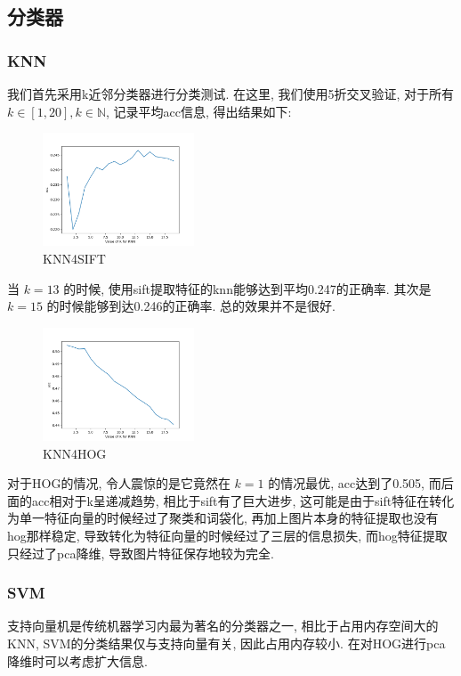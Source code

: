 \documentclass[lang=cn,12pt,a4paper,cite=authoryear]{elegantpaper}
\begin{document}
\subsection{分类器}
\subsubsection{KNN}
我们首先采用k近邻分类器进行分类测试. 在这里, 我们使用5折交叉验证, 对于所有 $k \in [1, 20], k \in \mathbb{N}$, 记录平均acc信息, 得出结果如下:
\begin{figure}[h]
    \centering
    \includegraphics[width=0.4\textwidth]{lateximgs/knn1.png}
    \caption{KNN4SIFT}
\end{figure}

当 $k=13$ 的时候, 使用sift提取特征的knn能够达到平均0.247的正确率. 其次是 $k=15$ 的时候能够到达0.246的正确率. 总的效果并不是很好.
\begin{figure}[h]
    \centering
    \includegraphics[width=0.4\textwidth]{lateximgs/knn2.png}
    \caption{KNN4HOG}
\end{figure}

对于HOG的情况, 令人震惊的是它竟然在 $k=1$ 的情况最优, acc达到了0.505, 而后面的acc相对于k呈递减趋势, 相比于sift有了巨大进步, 这可能是由于sift特征在转化为单一特征向量的时候经过了聚类和词袋化, 再加上图片本身的特征提取也没有hog那样稳定, 导致转化为特征向量的时候经过了三层的信息损失, 而hog特征提取只经过了pca降维, 导致图片特征保存地较为完全.

\subsubsection{SVM}
支持向量机是传统机器学习内最为著名的分类器之一, 相比于占用内存空间大的KNN, SVM的分类结果仅与支持向量有关, 因此占用内存较小. 在对HOG进行pca降维时可以考虑扩大信息.
\end{document}
